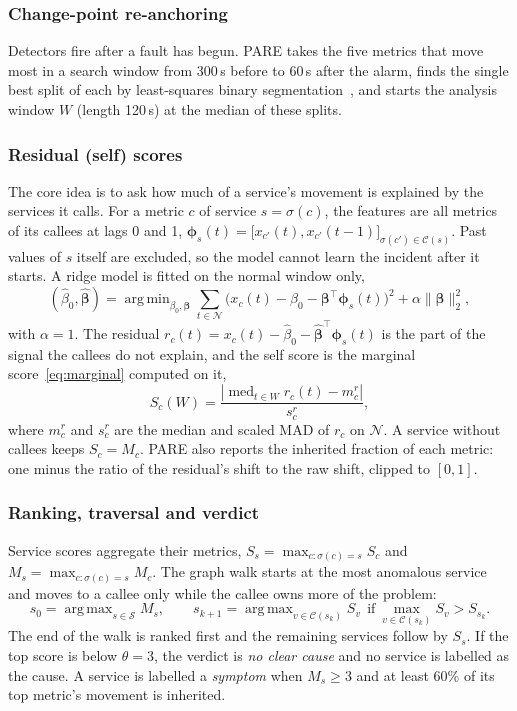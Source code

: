 \documentclass[conference]{IEEEtran}
\DeclareMathOperator*{\med}{med}
\DeclareMathOperator*{\argmax}{arg\,max}
\DeclareMathOperator*{\argmin}{arg\,min}
\newcommand{\Ccal}{\mathcal{C}}
\newcommand{\Scal}{\mathcal{S}}
\newcommand{\Ncal}{\mathcal{N}}
\begin{document}
\subsubsection{Change-point re-anchoring}
Detectors fire after a fault has begun. PARE takes the five metrics that move most
in a search window from 300\,s before to 60\,s after the alarm, finds the single
best split of each by least-squares binary segmentation~\cite{truong2020ruptures},
and starts the analysis window $W$ (length 120\,s) at the median of these splits.

\subsubsection{Residual (self) scores}
The core idea is to ask how much of a service's movement is explained by the
services it calls. For a metric $c$ of service $s=\sigma(c)$, the features are all
metrics of its callees at lags 0 and 1,
$\boldsymbol{\phi}_s(t)=\big[x_{c'}(t),x_{c'}(t-1)\big]_{\sigma(c')\in\Ccal(s)}$.
Past values of $s$ itself are excluded, so the model cannot learn the incident
after it starts. A ridge model is fitted on the normal window only,
\begin{equation}
(\hat\beta_0,\hat{\boldsymbol\beta})=\argmin_{\beta_0,\boldsymbol\beta}
\sum_{t\in\Ncal}\big(x_c(t)-\beta_0-\boldsymbol\beta^{\top}\boldsymbol\phi_s(t)\big)^2
+\alpha\|\boldsymbol\beta\|_2^2 ,
\label{eq:ridge}
\end{equation}
with $\alpha=1$. The residual $r_c(t)=x_c(t)-\hat\beta_0-\hat{\boldsymbol\beta}^{\top}
\boldsymbol\phi_s(t)$ is the part of the signal the callees do not explain, and the
self score is the marginal score~\eqref{eq:marginal} computed on it,
\begin{equation}
S_c(W)=\frac{\left|\med_{t\in W}r_c(t)-m^r_c\right|}{s^r_c},
\label{eq:self}
\end{equation}
where $m^r_c$ and $s^r_c$ are the median and scaled MAD of $r_c$ on $\Ncal$. A service
without callees keeps $S_c=M_c$. PARE also reports the inherited fraction of each
metric: one minus the ratio of the residual's shift to the raw shift, clipped to
$[0,1]$.

\subsubsection{Ranking, traversal and verdict}
Service scores aggregate their metrics, $S_s=\max_{c:\sigma(c)=s}S_c$ and
$M_s=\max_{c:\sigma(c)=s}M_c$. The graph walk starts at the most anomalous service
and moves to a callee only while the callee owns more of the problem:
\begin{equation}
s_0=\argmax_{s\in\Scal}M_s,\qquad
s_{k+1}=\argmax_{v\in\Ccal(s_k)}S_v\ \ \text{if}\ \max_{v\in\Ccal(s_k)}S_v>S_{s_k}.
\label{eq:walk}
\end{equation}
The end of the walk is ranked first and the remaining services follow by $S_s$.
If the top score is below $\theta=3$, the verdict is \emph{no clear cause} and no
service is labelled as the cause. A service is labelled a \emph{symptom} when
$M_s\ge3$ and at least 60\% of its top metric's movement is inherited.
\end{document}
